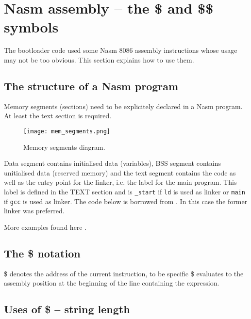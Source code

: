 \documentclass[a4paper]{article}
\begin{document}



\newpage
\section{Nasm assembly -- the \$ and \$\$ symbols}

The bootloader code used some Nasm 8086 assembly instructions whose usage may not be too obvious. This section explains how to use them.

\subsection{The structure of a Nasm program}

Memory segments (sections) need to be explicitely declared in a Nasm program. At least the text section is required.
\begin{figure}[H]
	\centering
	\texttt{[image: mem\_segments.png]}
	\caption{Memory segments diagram.}
	\label{fig:mem_segments}
\end{figure}

Data segment contains initialised data (variables), BSS segment contains unitialised data (reserved memory) and the text segment contains the code as well as the entry point for the linker, i.e. the label for the main program. This label is defined in the TEXT section and is \texttt{_start} if \texttt{ld} is used as linker or \texttt{main} if \texttt{gcc} is used as linker. The code below is borrowed from \cite{nasmtut}. In this case the former linker was preferred.




More examples found here \cite{nasmtut2}.


\subsection{The \$ notation}

\$ denotes the address of the current instruction, to be specific \$ evaluates to the assembly position at the beginning of the line containing the expression. 

\subsection{Uses of \$ -- string length}
\end{document}
